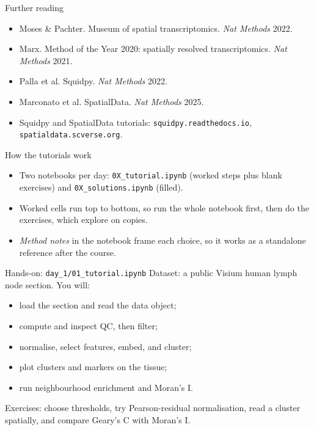 \documentclass[aspectratio=169]{beamer}
\begin{document}
\begin{frame}{Further reading}
  \footnotesize
  \begin{itemize}
    \item Moses \& Pachter. Museum of spatial transcriptomics. \emph{Nat Methods} 2022.
    \item Marx. Method of the Year 2020: spatially resolved transcriptomics. \emph{Nat Methods} 2021.
    \item Palla et al. Squidpy. \emph{Nat Methods} 2022.
    \item Marconato et al. SpatialData. \emph{Nat Methods} 2025.
    \item Squidpy and SpatialData tutorials: \texttt{squidpy.readthedocs.io}, \texttt{spatialdata.scverse.org}.
  \end{itemize}
\end{frame}

\begin{frame}{How the tutorials work}
  \begin{itemize}
    \item Two notebooks per day: \texttt{0X\_tutorial.ipynb} (worked steps plus blank
      exercises) and \texttt{0X\_solutions.ipynb} (filled).
    \item Worked cells run top to bottom, so run the whole notebook first, then do
      the exercises, which explore on copies.
    \item \emph{Method notes} in the notebook frame each choice, so it works as a
      standalone reference after the course.
  \end{itemize}
\end{frame}

\begin{frame}{Hands-on: \texttt{day\_1/01\_tutorial.ipynb}}
  Dataset: a public Visium human lymph node section. You will:
  \begin{itemize}
    \item load the section and read the data object;
    \item compute and inspect QC, then filter;
    \item normalise, select features, embed, and cluster;
    \item plot clusters and markers on the tissue;
    \item run neighbourhood enrichment and Moran's I.
  \end{itemize}
  Exercises: choose thresholds, try Pearson-residual normalisation, read a cluster
  spatially, and compare Geary's C with Moran's I.
\end{frame}
\end{document}
